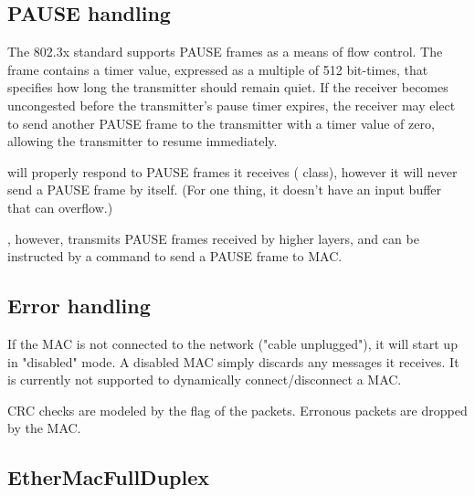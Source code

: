 \subsection*{PAUSE handling}
\label{subsec:pause_handling}

The 802.3x standard supports PAUSE frames as a means of flow
control. The frame contains a timer value, expressed as a multiple
of 512 bit-times, that specifies how long the transmitter should
remain quiet. If the receiver becomes uncongested before the
transmitter's pause timer expires, the receiver may elect to send
another PAUSE frame to the transmitter with a timer value of zero,
allowing the transmitter to resume immediately.

 will properly respond to PAUSE frames it receives
( class),
however it will never send a PAUSE frame by itself. (For one thing,
it doesn't have an input buffer that can overflow.)

, however, transmits PAUSE frames received by higher layers,
and  can be instructed by a command to send a PAUSE frame to MAC.


\subsection*{Error handling}

If the MAC is not connected to the network ("cable unplugged"), it will
start up in "disabled" mode. A disabled MAC simply discards any messages
it receives. It is currently not supported to dynamically connect/disconnect
a MAC.

CRC checks are modeled by the  flag of the packets. Erronous
packets are dropped by the MAC.





\subsection{EtherMacFullDuplex}

